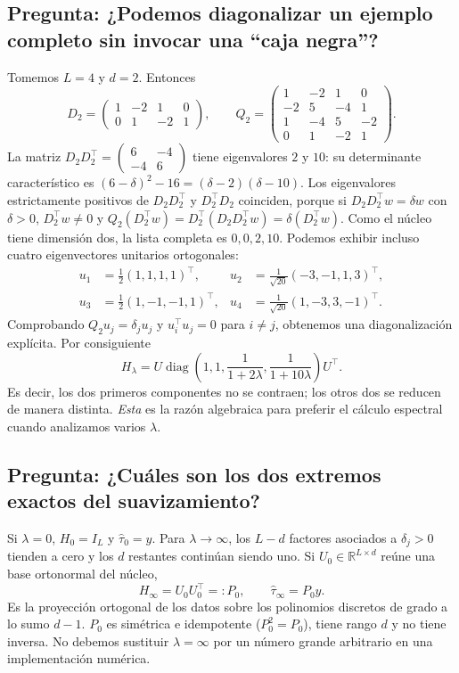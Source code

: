 \documentclass[11pt,letterpaper,parskip=half,headings=small]{scrartcl}
\theoremstyle{definition}\newtheorem{definicion}[proposicion]{Definición}
\theoremstyle{remark}\newtheorem{observacion}[proposicion]{Observación}
\newcommand{\R}{\mathbb R}\newcommand{\EE}{\mathbb E}\newcommand{\Var}{\operatorname{Var}}
\newcommand{\pregunta}[1]{\subsection{Pregunta: #1}}
\begin{document}
\pregunta{¿Podemos diagonalizar un ejemplo completo sin invocar una ``caja negra''?}
Tomemos $L=4$ y $d=2$. Entonces
\[
D_2=\begin{pmatrix}1&-2&1&0\\0&1&-2&1\end{pmatrix},\qquad
Q_2=\begin{pmatrix}1&-2&1&0\\-2&5&-4&1\\1&-4&5&-2\\0&1&-2&1\end{pmatrix}.
\]
La matriz $D_2D_2^\top=\begin{pmatrix}6&-4\\-4&6\end{pmatrix}$
tiene eigenvalores $2$ y $10$: su determinante característico es
$(6-\delta)^2-16=(\delta-2)(\delta-10)$.
Los eigenvalores estrictamente positivos de $D_2D_2^\top$ y $D_2^\top D_2$
coinciden, porque si $D_2D_2^\top w=\delta w$ con $\delta>0$,
$D_2^\top w\neq0$ y
$Q_2(D_2^\top w)=D_2^\top(D_2D_2^\top w)=\delta(D_2^\top w)$.
Como el núcleo tiene dimensión dos, la lista completa es $0,0,2,10$.
Podemos exhibir incluso cuatro eigenvectores unitarios ortogonales:
\[
\begin{aligned}
u_1&=\tfrac12(1,1,1,1)^\top,&
 u_2&=\tfrac1{\sqrt{20}}(-3,-1,1,3)^\top,\\
 u_3&=\tfrac12(1,-1,-1,1)^\top,&
 u_4&=\tfrac1{\sqrt{20}}(1,-3,3,-1)^\top.
\end{aligned}
\]
Comprobando $Q_2u_j=\delta_ju_j$ y $u_i^\top u_j=0$ para $i\ne j$,
obtenemos una diagonalización explícita. Por consiguiente
\[
H_\lambda=U\operatorname{diag}\left(1,1,
\frac1{1+2\lambda},\frac1{1+10\lambda}\right)U^\top.
\]
Es decir, los dos primeros componentes no se contraen; los otros dos
se reducen de manera distinta. \emph{Esta} es la razón algebraica
para preferir el cálculo espectral cuando analizamos varios $\lambda$.

\pregunta{¿Cuáles son los dos extremos exactos del suavizamiento?}
Si $\lambda=0$, $H_0=I_L$ y $\widehat\tau_0=y$. Para $\lambda\to\infty$, los $L-d$ factores asociados a $\delta_j>0$ tienden a cero y los $d$ restantes continúan siendo uno. Si $U_0\in\R^{L\times d}$ reúne una base ortonormal del núcleo,
\begin{equation}\label{eq:endpoint}
\boxed{H_\infty=U_0U_0^\top=:P_0,\qquad
\widehat\tau_\infty=P_0y.}
\end{equation}
Es la proyección ortogonal de los datos sobre los polinomios discretos de grado a lo sumo $d-1$. $P_0$ es simétrica e idempotente ($P_0^2=P_0$), tiene rango $d$ y no tiene inversa. No debemos sustituir $\lambda=\infty$ por un número grande arbitrario en una implementación numérica.
\end{document}
